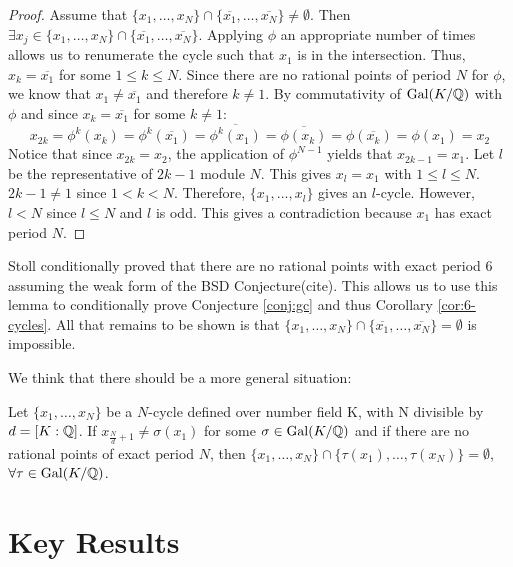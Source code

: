 \begin{proof}
  Assume that $\{x_1, \ldots, x_{N}\} \cap \{\overline{x_1}, \ldots,
  \overline{x_{N}}\} \neq \emptyset$.  Then $\exists x_j \in \{x_1,
  \ldots, x_{N}\} \cap \{\overline{x_1}, \ldots,
  \overline{x_{N}}\}$. Applying $\phi$ an appropriate number of times
  allows us to renumerate the cycle such that $x_1$ is in the
  intersection. Thus, $x_k = \overline{x_1}$ for some $1 \leq k \leq
  N$. Since there are no rational points of period $N$ for $\phi$, we
  know that $x_1 \neq \overline{x_1}$ and therefore $k \neq 1$. By
  commutativity of $\mathrm{Gal}(K/\mathbb{Q})$ with $\phi$ and since $x_k =
  \overline{x_1}$ for some $k \neq 1$:
  \[
  x_{2k} = \phi^k(x_k) = \phi^k(\overline{x_1}) =
  \overline{\phi^k(x_1)} = \overline{\phi(x_k)} = \phi(\overline{x_k})
  = \phi(x_1) = x_2
  \]
  Notice that since $x_{2k} = x_2$, the application of $\phi^{N-1}$
  yields that $x_{2k-1} = x_1$. Let $l$ be the representative of
  $2k-1$ module $N$. This gives $x_l = x_1$ with $1 \leq l \leq
  N$. $2k-1 \neq 1$ since $1 < k < N$. Therefore, $\{x_1, \ldots,
  x_l\}$ gives an $l$-cycle.  However, $l < N$ since $l \leq N$ and
  $l$ is odd. This gives a contradiction because $x_1$ has exact
  period $N$.
\end{proof}

\begin{remark}[N = 6 case]
  Stoll conditionally proved that there are no rational points with
  exact period 6 assuming the weak form of the BSD
  Conjecture(cite). This allows us to use this lemma to conditionally
  prove Conjecture \ref{conj:gc} and thus Corollary
  \ref{cor:6-cycles}. All that remains to be shown is that $\{x_1,
  \ldots, x_{N}\} \cap \{\overline{x_1}, \ldots, \overline{x_{N}}\} =
  \emptyset$ is impossible.
\end{remark}

We think that there should be a more general situation:
\begin{conjecture}
  Let $\{x_1, \ldots, x_{N}\}$ be a $N$-cycle defined over number
  field K, with N divisible by $d = [K:\mathbb{Q} ]$. If $x_{\frac{N}{d}+1}
  \neq \sigma(x_1)$ for some $\sigma \in \mathrm{Gal}(K/\mathbb{Q})$ and if there are
  no rational points of exact period $N$, then $\{x_1, \ldots, x_{N}\}
  \cap \{\tau(x_1), \ldots, \tau(x_{N})\} = \emptyset$, $\forall \tau
  \in \mathrm{Gal}(K/\mathbb{Q})$.
\end{conjecture}

\section{Key Results}

